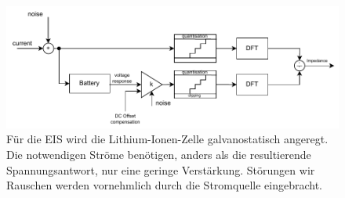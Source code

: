 \begin{figure}[h] 
	\centering 
	\includegraphics[width=1\columnwidth]{../img/histo_real.pdf}
	\caption{Für die EIS wird die Lithium-Ionen-Zelle galvanostatisch angeregt. Die notwendigen Ströme benötigen, anders als die resultierende Spannungsantwort, nur eine geringe Verstärkung. Störungen wir Rauschen werden vornehmlich durch die Stromquelle eingebracht.}
	\label{fig:system}
\end{figure}
